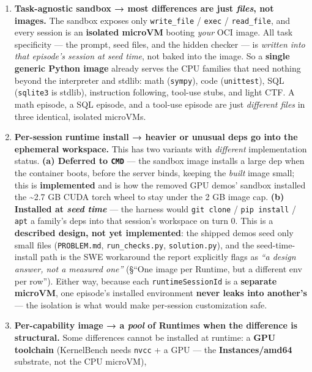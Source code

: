 \documentclass[
  paper=a4,
  ,captions=tableheading
]{scrartcl}
\providecommand{\tightlist}{%
  \setlength{\itemsep}{0pt}\setlength{\parskip}{0pt}}
\begin{document}
\begin{enumerate}
\def\labelenumi{\arabic{enumi}.}
\tightlist
\item
  \textbf{Task-agnostic sandbox → most differences are just
  \emph{files}, not images.} The sandbox exposes only
  \texttt{write\_file} / \texttt{exec} / \texttt{read\_file}, and every
  session is an \textbf{isolated microVM} booting \emph{your} OCI image.
  All task specificity --- the prompt, seed files, and the hidden
  checker --- is \emph{written into that episode's session at seed
  time}, not baked into the image. So a \textbf{single generic Python
  image} already serves the CPU families that need nothing beyond the
  interpreter and stdlib: math (\texttt{sympy}), code
  (\texttt{unittest}), SQL (\texttt{sqlite3} is stdlib), instruction
  following, tool-use stubs, and light CTF. A math episode, a SQL
  episode, and a tool-use episode are just \emph{different files} in
  three identical, isolated microVMs.
\item
  \textbf{Per-session runtime install → heavier or unusual deps go into
  the ephemeral workspace.} This has two variants with \emph{different}
  implementation status. \textbf{(a) Deferred to \texttt{CMD}} --- the
  sandbox image installs a large dep when the container boots, before
  the server binds, keeping the \emph{built} image small; this is
  \textbf{implemented} and is how the removed GPU demos' sandbox
  installed the \textasciitilde2.7 GB CUDA torch wheel to stay under the
  2 GB image cap. \textbf{(b) Installed at \emph{seed time}} --- the
  harness would \texttt{git\ clone} / \texttt{pip\ install} /
  \texttt{apt} a family's deps into that session's workspace on turn 0.
  This is a \textbf{described design, not yet implemented}: the shipped
  demos seed only small files (\texttt{PROBLEM.md},
  \texttt{run\_checks.py}, \texttt{solution.py}), and the
  seed-time-install path is the SWE workaround the report explicitly
  flags as \emph{``a design answer, not a measured one''} (§``One image
  per Runtime, but a different env per row''). Either way, because each
  \texttt{runtimeSessionId} is a \textbf{separate microVM}, one
  episode's installed environment \textbf{never leaks into another's}
  --- the isolation is what would make per-session customization safe.
\item
  \textbf{Per-capability image → a \emph{pool} of Runtimes when the
  difference is structural.} Some differences cannot be installed at
  runtime: a \textbf{GPU toolchain} (KernelBench needs \texttt{nvcc} + a
  GPU --- the \textbf{Instances/amd64} substrate, not the CPU microVM),

\end{enumerate}
\end{document}
